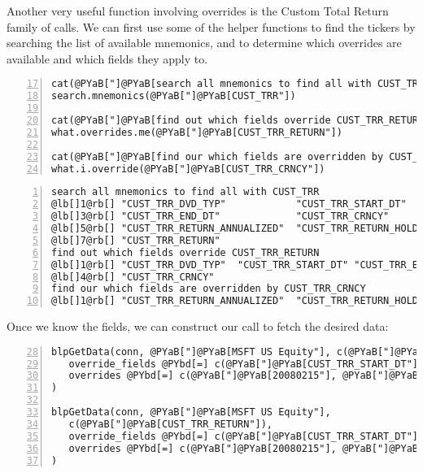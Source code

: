 \documentclass[a4paper]{article}
\begin{document}
    

Another very useful function involving overrides is the Custom Total Return family of calls. We can first use some of the helper functions to find the tickers by searching the list of available mnemonics, and to determine which overrides are available and which fields they apply to.

\begin{Verbatim}[commandchars=@\[\],numbers=left,firstnumber=17,stepnumber=1]
cat(@PYaB["]@PYaB[search all mnemonics to find all with CUST_TRR\n"])
search.mnemonics(@PYaB["]@PYaB[CUST_TRR"])

cat(@PYaB["]@PYaB[find out which fields override CUST_TRR_RETURN\n"])
what.overrides.me(@PYaB["]@PYaB[CUST_TRR_RETURN"])

cat(@PYaB["]@PYaB[find our which fields are overridden by CUST_TRR_CRNCY\n"])
what.i.override(@PYaB["]@PYaB[CUST_TRR_CRNCY"])
\end{Verbatim}

    

\begin{Verbatim}[commandchars=@\[\],numbers=left,firstnumber=1,stepnumber=1]
search all mnemonics to find all with CUST_TRR
@lb[]1@rb[] "CUST_TRR_DVD_TYP"            "CUST_TRR_START_DT"          
@lb[]3@rb[] "CUST_TRR_END_DT"             "CUST_TRR_CRNCY"             
@lb[]5@rb[] "CUST_TRR_RETURN_ANNUALIZED"  "CUST_TRR_RETURN_HOLDING_PER"
@lb[]7@rb[] "CUST_TRR_RETURN"            
find out which fields override CUST_TRR_RETURN
@lb[]1@rb[] "CUST_TRR_DVD_TYP"  "CUST_TRR_START_DT" "CUST_TRR_END_DT"  
@lb[]4@rb[] "CUST_TRR_CRNCY"   
find our which fields are overridden by CUST_TRR_CRNCY
@lb[]1@rb[] "CUST_TRR_RETURN_ANNUALIZED"  "CUST_TRR_RETURN_HOLDING_PER"
\end{Verbatim}

    

Once we know the fields, we can construct our call to fetch the desired data:

\begin{Verbatim}[commandchars=@\[\],numbers=left,firstnumber=28,stepnumber=1]
blpGetData(conn, @PYaB["]@PYaB[MSFT US Equity"], c(@PYaB["]@PYaB[CUST_TRR_RETURN"]),
   override_fields @PYbd[=] c(@PYaB["]@PYaB[CUST_TRR_START_DT"], @PYaB["]@PYaB[CUST_TRR_END_DT"]), 
   overrides @PYbd[=] c(@PYaB["]@PYaB[20080215"], @PYaB["]@PYaB[20080602"])
)

blpGetData(conn, @PYaB["]@PYaB[MSFT US Equity"], 
   c(@PYaB["]@PYaB[CUST_TRR_RETURN"]), 
   override_fields @PYbd[=] c(@PYaB["]@PYaB[CUST_TRR_START_DT"], @PYaB["]@PYaB[CUST_TRR_END_DT"], @PYaB["]@PYaB[CUST_TRR_CRNCY"]), 
   overrides @PYbd[=] c(@PYaB["]@PYaB[20080215"], @PYaB["]@PYaB[20080602"], @PYaB["]@PYaB[GBP"])
)
\end{Verbatim}
\end{document}
